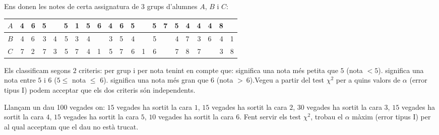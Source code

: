 \begin{prob}
{Ens donen les notes de
certa assignatura de 3 grups d'alumnes $A$, $B$ i $C$:
\begin{center}
\begin{tabular}{|c||r@{.}lr@{.}lr@{.}lr@{.}lr@{.}lr@{.}lr@{.}lr@{.}l
r@{.}lr@{.}l|}
\hline
$A$&4&6&5&&5&1&5&6&4&6&5&&5&7&5&4&4&4&8&\\\hline
$B$&4&6&3&4&5&3&4&&3&5&4&&5&&4&7&3&6&4&1\\\hline
$C$&7&2&7&3&5&7&4&1&5&7&6&1&6&&7&8&7&&3&8\\\hline
\end{tabular}
\end{center}

Els classificam segons $2$ criteris: per grup i per nota tenint en compte
que: significa una nota m\'es petita que $5$
(nota $<5$).
 significa una nota entre $5$ i $6$ ($5\leq$ nota
$\leq$ 6).
 significa una nota m\'es gran que $6$
(nota $>\ 6$).\newline Vegeu a partir del test $\chi^2$ per a quins
valors de $\alpha$ (error tipus I) podem acceptar que els dos criteris s\'on
independents.}
\end{prob} 

\begin{prob}
{Llan\c{c}am un dau 100 vegades on:
$15$ vegades ha sortit la cara $1$,
$15$ vegades ha sortit la cara $2$,
$30$ vegades ha sortit la cara $3$,
$15$ vegades ha sortit la cara $4$,
$15$ vegades ha sortit la cara $5$,
$10$ vegades ha sortit la cara $6$.
Fent servir els test $\chi^2$, trobau el $\alpha$ m\`axim 
(error tipus I) per al qual acceptam que el dau no est\`a trucat.
}
\end{prob}

